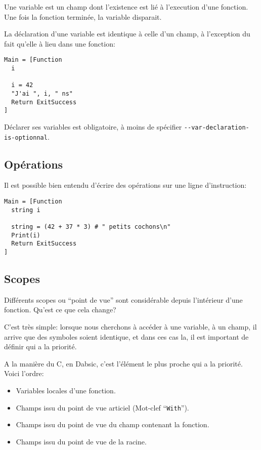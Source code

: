\documentclass[a5paper, 12pt]{book}
\begin{document}
Une variable est un champ dont l'existence est lié à l'execution
d'une fonction. Une fois la fonction terminée, la variable disparait.

La déclaration d'une variable est identique à celle d'un champ, à l'exception
du fait qu'elle à lieu dans une fonction:

\begin{verbatim}
Main = [Function
  i

  i = 42
  "J'ai ", i, " ns"
  Return ExitSuccess
]
\end{verbatim}

Déclarer ses variables est obligatoire, à moins de
spécifier \verb!--var-declaration-is-optionnal!.

\subsection{Opérations}

Il est possible bien entendu d'écrire des opérations sur une ligne
d'instruction:

\begin{verbatim}
Main = [Function
  string i

  string = (42 + 37 * 3) # " petits cochons\n"
  Print(i)
  Return ExitSuccess
]
\end{verbatim}

\subsection{Scopes}

Différents scopes ou ``point de vue'' sont considérable depuis
l'intérieur d'une fonction. Qu'est ce que cela change?

C'est très simple: lorsque nous cherchons à accéder à une
variable, à un champ, il arrive que des symboles soient
identique, et dans ces cas la, il est important de définir
qui a la priorité.

A la manière du C, en Dabsic, c'est l'élément le plus proche
qui a la priorité. Voici l'ordre:

\begin{itemize}
  \item Variables locales d'une fonction.
  \item Champs issu du point de vue articiel (Mot-clef ``\verb!With!'').
  \item Champs issu du point de vue du champ contenant la fonction.
  \item Champs issu du point de vue de la racine.
\end{itemize}
\end{document}
